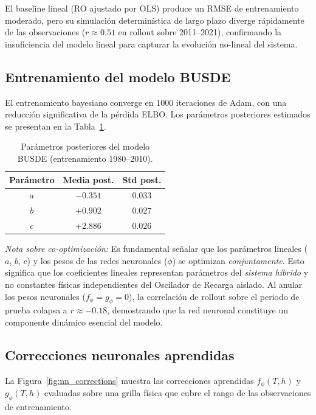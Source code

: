 \documentclass[11pt,a4paper]{article}
\begin{document}
El baseline lineal (RO ajustado por OLS) produce un RMSE de entrenamiento moderado, pero su simulación determinística de largo plazo diverge rápidamente de las observaciones ($r \approx 0.51$ en rollout sobre 2011--2021), confirmando la insuficiencia del modelo lineal para capturar la evolución no-lineal del sistema.

\subsection{Entrenamiento del modelo BUSDE}

El entrenamiento bayesiano converge en 1000 iteraciones de Adam, con una reducción significativa de la pérdida ELBO. Los parámetros posteriores estimados se presentan en la Tabla~\ref{tab:posterior}.

\begin{table}[H]
\centering
\caption{Parámetros posteriores del modelo BUSDE (entrenamiento 1980--2010).}
\label{tab:posterior}
\begin{tabular}{ccc}
\toprule
\textbf{Parámetro} & \textbf{Media post.} & \textbf{Std post.} \\
\midrule
$a$ & $-0.351$ & $0.033$ \\
$b$ & $+0.902$ & $0.027$ \\
$c$ & $+2.886$ & $0.026$ \\
\bottomrule
\end{tabular}
\end{table}


\noindent \textit{Nota sobre co-optimización:} Es fundamental señalar que los parámetros lineales ($a$, $b$, $c$) y los pesos de las redes neuronales ($\phi$) se optimizan \textit{conjuntamente}. Esto significa que los coeficientes lineales representan parámetros del \textit{sistema híbrido} y no constantes físicas independientes del Oscilador de Recarga aislado. Al anular los pesos neuronales ($f_\phi = g_\phi = 0$), la correlación de rollout sobre el periodo de prueba colapsa a $r \approx -0.18$, demostrando que la red neuronal constituye un componente dinámico esencial del modelo.

\subsection{Correcciones neuronales aprendidas}

La Figura~\ref{fig:nn_corrections} muestra las correcciones aprendidas $f_\phi(T, h)$ y $g_\phi(T, h)$ evaluadas sobre una grilla física que cubre el rango de las observaciones de entrenamiento.
\end{document}
